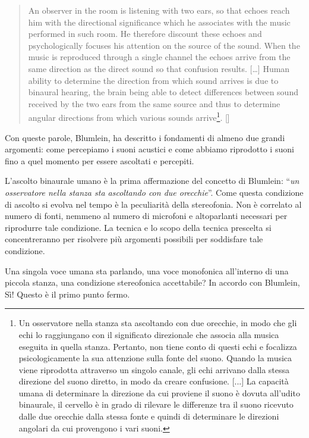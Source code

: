 \begin{quotation}
An observer in the room is listening with two ears, so that echoes reach him
with the directional significance which he associates with the music performed
in such room. He therefore discount these echoes and psychologically focuses
his attention on the source of the sound. When the music is reproduced through
a single channel the echoes arrive from the same direction as the direct sound
so that confusion results. [\ldots] Human ability to determine the direction
from which sound arrives is due to binaural hearing, the brain being able to
detect differences between sound received by the two ears from the same source
and thus to determine angular directions from which various sounds
arrive\footnote{Un osservatore nella stanza sta ascoltando con due orecchie, in
modo che gli echi lo raggiungano con il significato direzionale che associa alla
musica eseguita in quella stanza. Pertanto, non tiene conto di questi echi e
focalizza psicologicamente la sua attenzione sulla fonte del suono. Quando la
musica viene riprodotta attraverso un singolo canale, gli echi arrivano dalla
stessa direzione del suono diretto, in modo da creare confusione. [...] La
capacità umana di determinare la direzione da cui proviene il suono è dovuta
all'udito binaurale, il cervello è in grado di rilevare le differenze tra il
suono ricevuto dalle due orecchie dalla stessa fonte e quindi di determinare le
direzioni angolari da cui provengono i vari suoni.}. [\cite{ab58}]
\end{quotation}

Con queste parole, Blumlein, ha descritto i fondamenti di almeno due grandi
argomenti: come percepiamo i suoni acustici e come abbiamo riprodotto i suoni
fino a quel momento per essere ascoltati e percepiti.

L'ascolto binaurale umano è la prima affermazione del concetto di Blumlein:
“\emph{un osservatore nella stanza sta ascoltando con due orecchie}”. Come
questa condizione di ascolto si evolva nel tempo è la peculiarità della
stereofonia. Non è correlato al numero di fonti, nemmeno al numero di microfoni
e altoparlanti necessari per riprodurre tale condizione. La tecnica e lo scopo
della tecnica prescelta si concentreranno per risolvere più argomenti possibili
per soddisfare tale condizione.

Una singola voce umana sta parlando, una voce monofonica all'interno di una
piccola stanza, una condizione stereofonica accettabile? In accordo con Blumlein,
Sì! Questo è il primo punto fermo.

